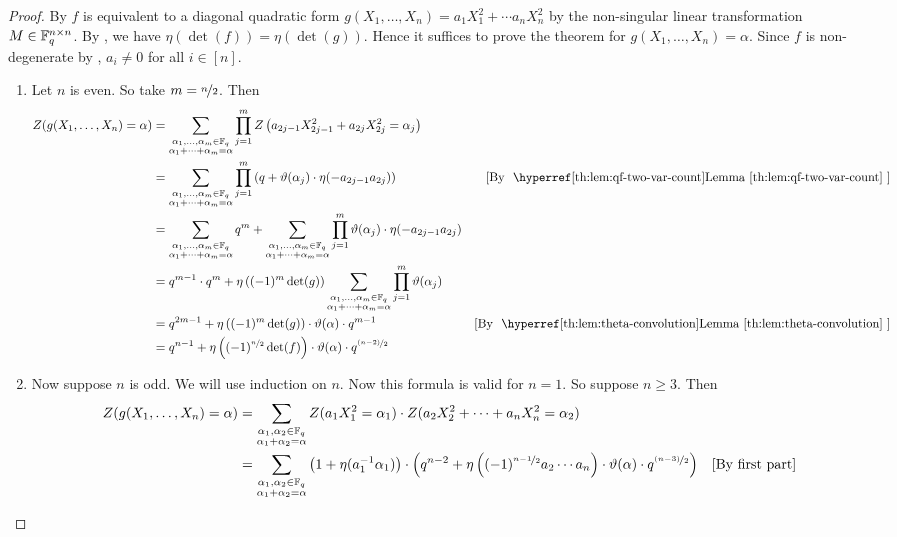 \begin{proof}
  By \QFDiagthm $f$ is equivalent to a diagonal quadratic form $g(X_1,\dots, X_n)=a_1X_1^2+\cdots a_nX_n^2$ by the non-singular linear transformation $M\in\mathbb{F}_q^{n\times n}$. By \QFEquivDetObs, we have $\eta(\det(f))=\eta(\det(g))$. Hence it suffices to prove the theorem for $g(X_1,\dots, X_n)=\alpha$. Since $f$ is non-degenerate by \QFDiagRankDetObs, $a_i\neq 0$ for all $i\in[n]$. 
  \begin{enumerate}[label=(\roman*)]
    \item Let $n$ is even. So take $m=\nicefrac{n}2$. Then 
  \begin{align*}
    Z(g(X_1,\dots, X_n)=\alpha) & = \sum_{\substack{\alpha_1,\dots,\alpha_m\in\bbF_q\\ \alpha_1+\cdots+\alpha_m=\alpha}}\prod_{j=1}^mZ\lt(a_{2j-1}X_{2j-1}^2+a_{2j}X_{2j}^2=\alpha_j\rt)\\ 
    & = \sum_{\substack{\alpha_1,\dots,\alpha_m\in\bbF_q\\ \alpha_1+\cdots+\alpha_m=\alpha}} \prod_{j=1}^m \lt(q+\vth(\alpha_j)\cdot\eta(-a_{2j-1}a_{2j})\rt)\by{\QFTwoVarlem}\\ 
    & = \sum_{\substack{\alpha_1,\dots,\alpha_m\in\bbF_q\\ \alpha_1+\cdots+\alpha_m=\alpha}} q^m+ \sum_{\substack{\alpha_1,\dots,\alpha_m\in\bbF_q\\ \alpha_1+\cdots+\alpha_m=\alpha}}\prod_{j=1}^m \vth(\alpha_j)\cdot\eta(-a_{2j-1}a_{2j})\\ 
    & = q^{m-1}\cdot q^m+ \eta\lt((-1)^m\det(g)\rt)\sum_{\substack{\alpha_1,\dots,\alpha_m\in\bbF_q\\ \alpha_1+\cdots+\alpha_m=\alpha}}\prod_{j=1}^m\vth(\alpha_j)\\ 
    & = q^{2m-1}+\eta\lt((-1)^m\det(g)\rt)\cdot \vth(\alpha)\cdot q^{m-1}\by{\QFConvProplem}\\ 
    & = q^{n-1}+\eta\lt((-1)^{\nicefrac{n}2}\det(f)\rt)\cdot \vth(\alpha)\cdot q^{\nicefrac{(n-2)}{2}}
  \end{align*}
  \item Now suppose $n$ is odd. We will use induction on $n$. Now this formula is valid for $n=1$. So suppose $n\geq 3$. Then 
  \begin{align*}
    Z(g(X_1,\dots, X_n)=\alpha) & = \sum_{\substack{\alpha_1,\alpha_2\in\bbF_q\\ \alpha_1+\alpha_2=\alpha}}Z(a_1X_1^2=\alpha_1)\cdot Z(a_2X_2^2+\cdots +a_nX_n^2=\alpha_2)\\ 
    & = \sum_{\substack{\alpha_1,\alpha_2\in\bbF_q\\ \alpha_1+\alpha_2=\alpha}} \lt(1+\eta(a_1^{-1}\alpha_1)\rt)\cdot \lt(q^{n-2}+\eta\lt((-1)^{\nicefrac{n-1}2}a_2\cdots a_n\rt)\cdot \vth(\alpha)\cdot q^{\nicefrac{(n-3)}{2}}\rt)\by{first part}\\ 

\end{align*}
\end{enumerate}
\end{proof}
